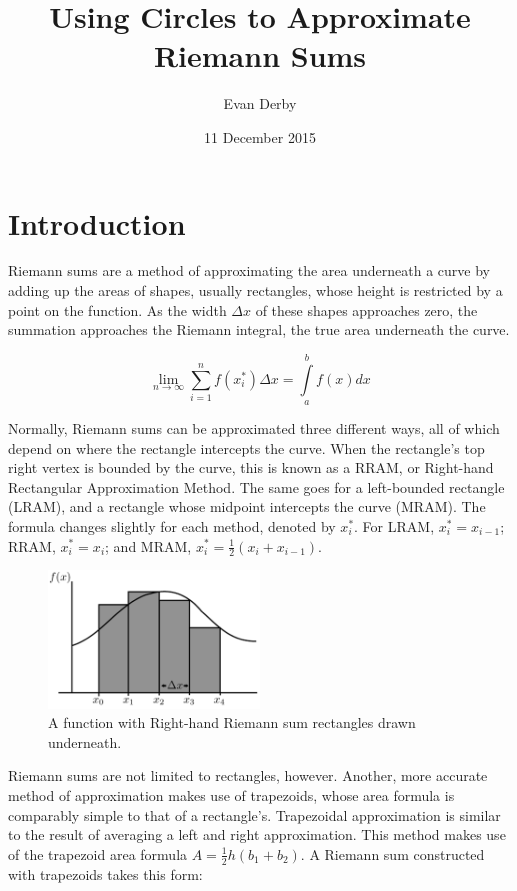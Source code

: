 \documentclass{article}
\begin{document}
  \title{Using Circles to Approximate Riemann Sums}
  \author{Evan Derby}
  \date{11 December 2015}
  \maketitle

  \section{Introduction}
    Riemann sums are a method of approximating the area underneath a curve by adding up the areas of shapes, usually rectangles, whose height is restricted by a point on the function. As the width \( \Delta x \) of these shapes approaches zero, the summation approaches the Riemann integral, the true area underneath the curve.

    \[ \displaystyle\lim_{n \to \infty}\sum_{i=1}^{n} f(x^*_i) \Delta x = \int\limits_a^b f(x)dx \]

    Normally, Riemann sums can be approximated three different ways, all of which depend on where the rectangle intercepts the curve. When the rectangle's top right vertex is bounded by the curve, this is known as a RRAM, or Right-hand Rectangular Approximation Method. The same goes for a left-bounded rectangle (LRAM), and a rectangle whose midpoint intercepts the curve (MRAM). The formula changes slightly for each method, denoted by \( x^*_i \). For LRAM, \( x_i^* = x_{i-1} \); RRAM, \( x_i^* = x_i \); and MRAM, \( x_i^* = \frac{1}{2}(x_i + x_{i-1}) \).

    \begin{figure}[h]
      \centering
      \includegraphics[width=0.5\textwidth]{riemann_1}
      \caption{A function with Right-hand Riemann sum rectangles drawn underneath.}
    \end{figure}

    Riemann sums are not limited to rectangles, however. Another, more accurate method of approximation makes use of trapezoids, whose area formula is comparably simple to that of a rectangle's. Trapezoidal approximation is similar to the result of averaging a left and right approximation. This method makes use of the trapezoid area formula \( A = \frac{1}{2}h(b_1+b_2) \). A Riemann sum constructed with trapezoids takes this form:
\end{document}
